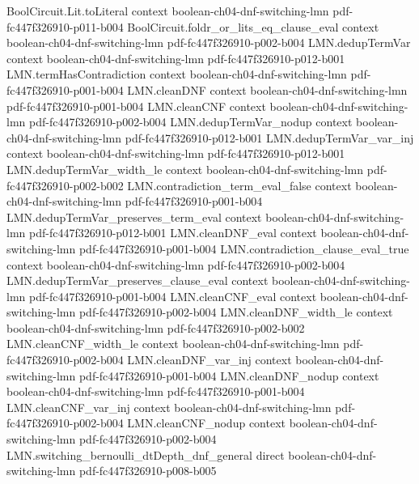 \begin{lemma}
\proofstep
  {BoolCircuit.Lit.toLiteral}
  {context}
  {boolean-ch04-dnf-switching-lmn}
  {pdf-fc447f326910-p011-b004}
\proofstep
  {BoolCircuit.foldr_or_lits_eq_clause_eval}
  {context}
  {boolean-ch04-dnf-switching-lmn}
  {pdf-fc447f326910-p002-b004}
\proofstep
  {LMN.dedupTermVar}
  {context}
  {boolean-ch04-dnf-switching-lmn}
  {pdf-fc447f326910-p012-b001}
\proofstep
  {LMN.termHasContradiction}
  {context}
  {boolean-ch04-dnf-switching-lmn}
  {pdf-fc447f326910-p001-b004}
\proofstep
  {LMN.cleanDNF}
  {context}
  {boolean-ch04-dnf-switching-lmn}
  {pdf-fc447f326910-p001-b004}
\proofstep
  {LMN.cleanCNF}
  {context}
  {boolean-ch04-dnf-switching-lmn}
  {pdf-fc447f326910-p002-b004}
\proofstep
  {LMN.dedupTermVar_nodup}
  {context}
  {boolean-ch04-dnf-switching-lmn}
  {pdf-fc447f326910-p012-b001}
\proofstep
  {LMN.dedupTermVar_var_inj}
  {context}
  {boolean-ch04-dnf-switching-lmn}
  {pdf-fc447f326910-p012-b001}
\proofstep
  {LMN.dedupTermVar_width_le}
  {context}
  {boolean-ch04-dnf-switching-lmn}
  {pdf-fc447f326910-p002-b002}
\proofstep
  {LMN.contradiction_term_eval_false}
  {context}
  {boolean-ch04-dnf-switching-lmn}
  {pdf-fc447f326910-p001-b004}
\proofstep
  {LMN.dedupTermVar_preserves_term_eval}
  {context}
  {boolean-ch04-dnf-switching-lmn}
  {pdf-fc447f326910-p012-b001}
\proofstep
  {LMN.cleanDNF_eval}
  {context}
  {boolean-ch04-dnf-switching-lmn}
  {pdf-fc447f326910-p001-b004}
\proofstep
  {LMN.contradiction_clause_eval_true}
  {context}
  {boolean-ch04-dnf-switching-lmn}
  {pdf-fc447f326910-p002-b004}
\proofstep
  {LMN.dedupTermVar_preserves_clause_eval}
  {context}
  {boolean-ch04-dnf-switching-lmn}
  {pdf-fc447f326910-p001-b004}
\proofstep
  {LMN.cleanCNF_eval}
  {context}
  {boolean-ch04-dnf-switching-lmn}
  {pdf-fc447f326910-p002-b004}
\proofstep
  {LMN.cleanDNF_width_le}
  {context}
  {boolean-ch04-dnf-switching-lmn}
  {pdf-fc447f326910-p002-b002}
\proofstep
  {LMN.cleanCNF_width_le}
  {context}
  {boolean-ch04-dnf-switching-lmn}
  {pdf-fc447f326910-p002-b004}
\proofstep
  {LMN.cleanDNF_var_inj}
  {context}
  {boolean-ch04-dnf-switching-lmn}
  {pdf-fc447f326910-p001-b004}
\proofstep
  {LMN.cleanDNF_nodup}
  {context}
  {boolean-ch04-dnf-switching-lmn}
  {pdf-fc447f326910-p001-b004}
\proofstep
  {LMN.cleanCNF_var_inj}
  {context}
  {boolean-ch04-dnf-switching-lmn}
  {pdf-fc447f326910-p002-b004}
\proofstep
  {LMN.cleanCNF_nodup}
  {context}
  {boolean-ch04-dnf-switching-lmn}
  {pdf-fc447f326910-p002-b004}
\proofstep
  {LMN.switching_bernoulli_dtDepth_dnf_general}
  {direct}
  {boolean-ch04-dnf-switching-lmn}
  {pdf-fc447f326910-p008-b005}

\end{lemma}
